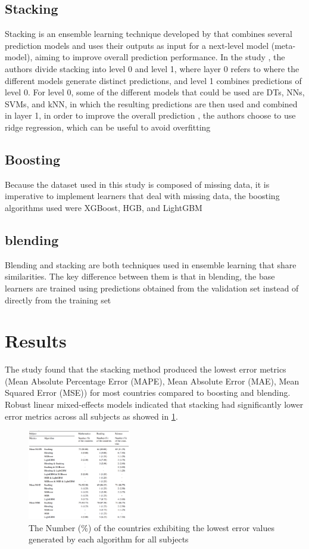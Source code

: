 \documentclass[final,5p,times,twocolumn,authoryear]{elsarticle}
\begin{document}
\subsection{Stacking}
Stacking is an ensemble learning technique developed by \cite{WOLPERT1992241} that combines several prediction models and uses their outputs as input for a next-level model (meta-model), aiming to improve overall prediction performance\cite{Stacking}. In the study \cite{Stacking}, the authors divide stacking into level 0 and level 1, where layer 0 refers to where the different models generate distinct predictions, and level 1 combines predictions of level 0. For level 0, some of the different models that could be used are DTs, NNs, SVMs, and kNN, in which the resulting predictions are then used and combined in layer 1, in order to improve the overall prediction \cite{WOLPERT1992241}, the authors choose to use ridge regression, which can be useful to avoid overfitting \cite{CUI2021107038}
\subsection{Boosting}
Because the dataset used in this study is composed of missing data, it is imperative to implement learners that deal with missing data, the boosting algorithms used were XGBoost, HGB, and LightGBM \cite{Stacking}
\subsection{blending}
Blending and stacking are both techniques used in ensemble learning that share similarities. The key difference between them is that in blending, the base learners are trained using predictions obtained from the validation set instead of directly from the training set\cite{Stacking}
\section{Results}
The study found that the stacking method produced the lowest error metrics (Mean Absolute Percentage Error (MAPE), Mean Absolute Error (MAE), Mean Squared Error (MSE)) for most countries compared to boosting and blending. Robust linear mixed-effects models indicated that stacking had significantly lower error metrics across all subjects as showed in \ref{fig:results}.

\begin{figure}
	\centering
	\includegraphics[width=0.4\textwidth]{figures/figure1}
	\caption{The Number (\%) of the countries exhibiting the lowest error values generated by each algorithm for all subjects \cite{Stacking}}
	\label{fig:results}
\end{figure}
\end{document}
